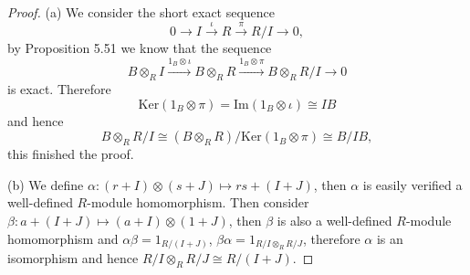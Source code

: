 \begin{proof}
(a) We consider the short exact sequence 
$$
0\longrightarrow I\overset{\iota}{\longrightarrow}R\overset{\pi}{\longrightarrow}R/I\longrightarrow 0,
$$
by Proposition 5.51 we know that the sequence 
$$
B\otimes _RI\overset{1_B\otimes \iota}{\longrightarrow}B\otimes _RR\overset{1_B\otimes \pi}{\longrightarrow}B\otimes _RR/I\longrightarrow 0
$$
is exact. Therefore 
$$
\mathrm{Ker}\left( 1_B\otimes \pi \right) =\mathrm{Im}\left( 1_B\otimes \iota \right) \cong IB
$$
and hence 
$$
B\otimes _RR/I\cong \left( B\otimes _RR \right) /\mathrm{Ker}\left( 1_B\otimes \pi \right) \cong B/IB,
$$
this finished the proof.\par
(b) We define $\alpha:(r+I)\otimes(s+J)\mapsto rs+(I+J)$, then $\alpha$ is easily verified a well-defined $R$-module homomorphism. Then consider $\beta:a+(I+J)\mapsto (a+I)\otimes(1+J)$, then $\beta$ is also a well-defined $R$-module homomorphism and $\alpha\beta=1_{R/(I+J)}$, $\beta\alpha=1_{R/I\otimes_RR/J}$, therefore $\alpha$ is an isomorphism and hence $R/I\otimes_RR/J\cong R/(I+J)$.
\end{proof}
